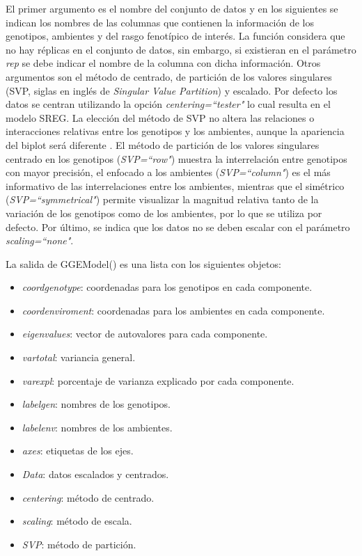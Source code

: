 El primer argumento es el nombre del conjunto de datos y en los siguientes se indican los nombres de las columnas que contienen la información de los genotipos, ambientes y del rasgo fenotípico de interés. La función considera que no hay réplicas en el conjunto de datos, sin embargo, si existieran en el parámetro \emph{rep} se debe indicar el nombre de la columna con dicha información. Otros argumentos son el método de centrado, de partición de los valores singulares (SVP, siglas en inglés de \emph{Singular Value Partition}) y escalado. Por defecto los datos se centran utilizando la opción \emph{centering=``tester"} lo cual resulta en el modelo SREG. La elección del método de SVP no altera las relaciones o interacciones relativas entre los genotipos y los ambientes, aunque la apariencia del biplot será diferente \citep{Yan2002}. El método de partición de los valores singulares centrado en los genotipos (\emph{SVP=``row"}) muestra la interrelación entre genotipos con mayor precisión, el enfocado a los ambientes (\emph{SVP=``column"}) es el más informativo de las interrelaciones entre los ambientes, mientras que el simétrico (\emph{SVP=``symmetrical"}) permite visualizar la magnitud relativa tanto de la variación de los genotipos como de los ambientes, por lo que se utiliza por defecto. Por último, se indica que los datos no se deben escalar con el parámetro \emph{scaling=``none"}. 

La salida de \textcolor{fandango}{GGEModel()} es una lista con los siguientes objetos:
\begin{itemize}
\item \emph{coordgenotype}: coordenadas para los genotipos en cada componente.
\item \emph{coordenviroment}: coordenadas para los ambientes en cada componente.
\item \emph{eigenvalues}: vector de autovalores para cada componente.
\item \emph{vartotal}: variancia general.
\item \emph{varexpl}: porcentaje de varianza explicado por cada componente.
\item \emph{labelgen}: nombres de los genotipos.
\item \emph{labelenv}: nombres de los ambientes.
\item \emph{axes}: etiquetas de los ejes.
\item \emph{Data}: datos escalados y centrados.
\item \emph{centering}: método de centrado.
\item \emph{scaling}: método de escala.
\item \emph{SVP}: método de partición. 
\end{itemize}


